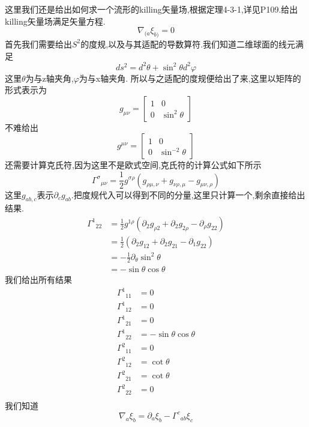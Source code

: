 \documentclass[../main.tex]{subfiles}
\begin{document}
这里我们还是给出如何求一个流形的killing矢量场,根据定理4-3-1,详见P109.给出killing矢量场满足矢量方程.
$$
	\nabla_{(a}\xi_{b)} = 0
$$
首先我们需要给出$S^2 $的度规,以及与其适配的导数算符.我们知道二维球面的线元满足$$
	ds^2 = d^2\theta + \sin^2\theta d^2\varphi
$$这里$\theta$为与z轴夹角,$\varphi $为与x轴夹角.
所以与之适配的度规便给出了来,这里以矩阵的形式表示为$$
	g_{\mu\nu} = \begin{bmatrix}
		1 & 0             \\
		0 & \sin^2 \theta
	\end{bmatrix}$$
不难给出$$
	g^{\mu\nu} = \begin{bmatrix}
		1 & 0                \\
		0 & \sin^{-2} \theta
	\end{bmatrix}$$
还需要计算克氏符,因为这里不是欧式空间,克氏符的计算公式如下所示$$
	\Gamma^{\sigma}{}_{\mu\nu} = \frac{1}{2}g^{\sigma \rho}(g_{\rho\mu,\nu} + g_{\nu\rho,\mu} - g_{\mu\nu,\rho})$$
这里$g_{ab,c}$表示$\partial_{c}g_{ab}$.把度规代入可以得到不同的分量,这里只计算一个,剩余直接给出结果.
\begin{align*}
	\Gamma^{1}{}_{22} & = \frac{1}{2} g^{1\rho}(\partial_{2}g_{\rho 2} + \partial_{2}g_{2 \rho} - \partial_{\rho}g_{22}) \\
	                  & = \frac{1}{2} (\partial_{2}g_{1 2} + \partial_{2}g_{21 } - \partial_{1}g_{22})                   \\
	                  & =- \frac{1}{2} \partial_{\theta} \sin^2\theta                                                    \\
	                  & =-\sin \theta \cos \theta
\end{align*}
我们给出所有结果
\begin{align*}
	\Gamma^{1}{}_{11} & =0                        \\
	\Gamma^{1}{}_{12} & =0                        \\
	\Gamma^{1}{}_{21} & =0                        \\
	\Gamma^{1}{}_{22} & =-\sin \theta \cos \theta \\
	\Gamma^{2}{}_{11} & =0                        \\
	\Gamma^{2}{}_{12} & =\cot \theta              \\
	\Gamma^{2}{}_{21} & =\cot \theta              \\
	\Gamma^{2}{}_{22} & =0                        \\
\end{align*}
我们知道$$
	\nabla_a \xi_b = \partial_a \xi_b - \Gamma^{c}{}_{ab}\xi_c
$$
\end{document}
